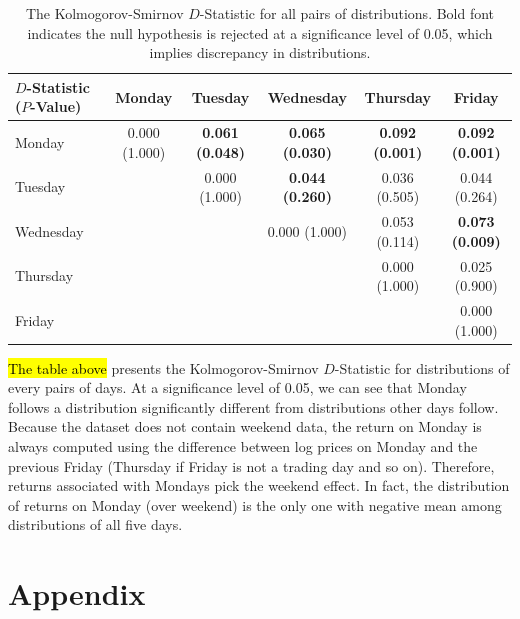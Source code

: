 \documentclass[12pt]{article}
\begin{document}
	\begin{table}[H]
		\small
		\center
		\begin{tabular}{|l|c|c|c|c|c|}
			\hline
			$D$-Statistic ($P$-Value)& Monday & Tuesday & Wednesday & Thursday & Friday \\
			\hline 
			Monday    & 0.000 (1.000) & \textbf{0.061 (0.048)} & \textbf{0.065 (0.030)} & \textbf{0.092 (0.001)} & \textbf{0.092 (0.001)} \\
			Tuesday   &               & 0.000 (1.000) & \textbf{0.044 (0.260)} & 0.036 (0.505) & 0.044 (0.264) \\
			Wednesday &               &               & 0.000 (1.000) & 0.053 (0.114) & \textbf{0.073 (0.009)} \\
			Thursday  &               &               &               & 0.000 (1.000) & 0.025 (0.900) \\
			Friday    &               &               &               &               & 0.000 (1.000) \\
			\hline
		\end{tabular}
		\caption{The Kolmogorov-Smirnov $D$-Statistic for all pairs of distributions. Bold font indicates the null hypothesis is rejected at a significance level of 0.05, which implies discrepancy in distributions.}
	\end{table}
	\hl{The table above} presents the Kolmogorov-Smirnov $D$-Statistic for distributions of every pairs of days. At a significance level of 0.05, we can see that Monday follows a distribution significantly different from distributions other days follow. Because the dataset does not contain weekend data, the return on Monday is always computed using the difference between log prices on Monday and the previous Friday (Thursday if Friday is not a trading day and so on). Therefore, returns associated with Mondays pick the weekend effect. In fact, the distribution of returns on Monday (over weekend) is the only one with negative mean among distributions of all five days.

	
	
	

	\section{Appendix}
\end{document}
